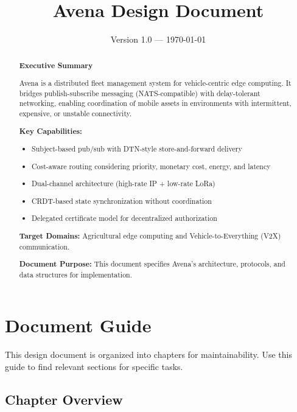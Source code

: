 \documentclass[11pt,a4paper]{article}
\title{\textbf{Avena Design Document}}
\author{}
\date{Version 1.0 --- \today}
\begin{document}
\maketitle

\begin{abstract}
\noindent\textbf{Executive Summary}

Avena is a distributed fleet management system for vehicle-centric edge computing. It bridges publish-subscribe messaging (NATS-compatible) with delay-tolerant networking, enabling coordination of mobile assets in environments with intermittent, expensive, or unstable connectivity.

\textbf{Key Capabilities:}
\begin{itemize}[nosep]
\item Subject-based pub/sub with DTN-style store-and-forward delivery
\item Cost-aware routing considering priority, monetary cost, energy, and latency
\item Dual-channel architecture (high-rate IP + low-rate LoRa)
\item CRDT-based state synchronization without coordination
\item Delegated certificate model for decentralized authorization
\end{itemize}

\textbf{Target Domains:} Agricultural edge computing and Vehicle-to-Everything (V2X) communication.

\textbf{Document Purpose:} This document specifies Avena's architecture, protocols, and data structures for implementation.
\end{abstract}

\section*{Document Guide}

This design document is organized into chapters for maintainability. Use this guide to find relevant sections for specific tasks.

\subsection*{Chapter Overview}
\end{document}
